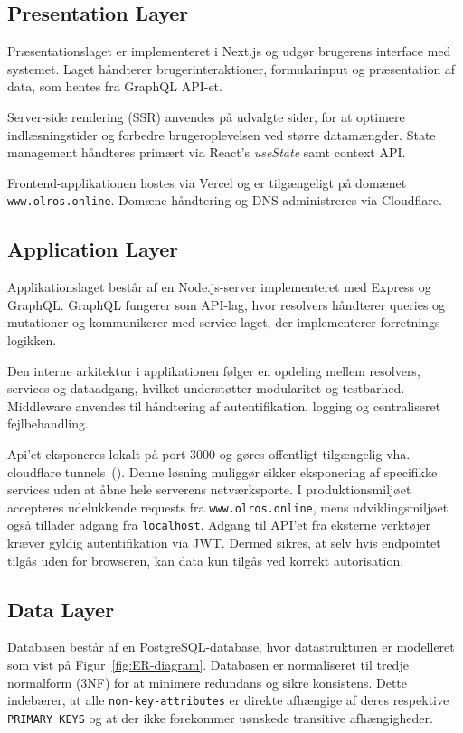 \subsection{Presentation Layer}
Præsentationslaget er implementeret i Next.js og udgør brugerens interface med systemet.
Laget håndterer brugerinteraktioner, formularinput og præsentation af data, som hentes fra GraphQL API-et.

Server-side rendering (SSR) anvendes på udvalgte sider, for at optimere indlæsningstider
og forbedre brugeroplevelsen ved større datamængder.
State management håndteres primært via React's \textit{useState} samt context API\@.

Frontend-applikationen hostes via Vercel og er tilgængeligt på domænet \texttt{www.olros.online}.
Domæne-håndtering og DNS administreres via Cloudflare.

\subsection{Application Layer}

Applikationslaget består af en Node.js-server implementeret med Express og GraphQL.
GraphQL fungerer som API-lag, hvor resolvers håndterer queries og mutationer
og kommunikerer med service-laget, der implementerer forretnings-logikken.

Den interne arkitektur i applikationen følger en opdeling mellem resolvers, services og dataadgang,
hvilket understøtter modularitet og testbarhed.
Middleware anvendes til håndtering af autentifikation, logging og centraliseret fejlbehandling.

Api'et eksponeres lokalt på port 3000 og gøres offentligt tilgængelig vha. cloudflare tunnels\ (\cite{cloudflare_tunnels}).
Denne løsning muliggør sikker eksponering af specifikke services uden at åbne hele serverens netværksporte.
I produktionsmiljøet accepteres udelukkende requests fra \texttt{www.olros.online}, mens udviklingsmiljøet
også tillader adgang fra \texttt{localhost}.
Adgang til API'et fra eksterne verktøjer kræver gyldig autentifikation via JWT. Dermed sikres, at selv hvis endpointet
tilgås uden for browseren, kan data kun tilgås ved korrekt autorisation.

\subsection{Data Layer}

Databasen består af en PostgreSQL-database, hvor datastrukturen er modelleret som vist på Figur~\ref{fig:ER-diagram}.
Databasen er normaliseret til tredje normalform (3NF) for at minimere redundans og sikre konsistens. Dette indebærer, at
alle \texttt{non-key-attributes} er direkte afhængige af deres respektive \texttt{PRIMARY KEYS} og at der ikke forekommer
uønskede transitive afhængigheder.

